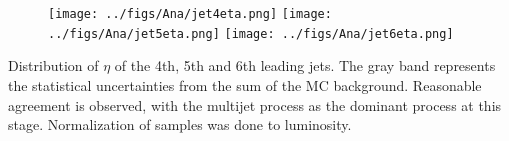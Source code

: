 \begin{frame}{}
\vspace{-.2cm}
\begin{figure}[!Hhtbp]
  \begin{center}
    \texttt{[image: ../figs/Ana/jet4eta.png]}
    \texttt{[image: ../figs/Ana/jet5eta.png]}
    \texttt{[image: ../figs/Ana/jet6eta.png]}
  \end{center}
\end{figure}

\vspace{-.2cm}
    \begin{block}{}
      \tiny \centering Distribution of $\eta$ of the 4th, 5th and 6th leading jets. The gray band represents the statistical uncertainties from the sum of the MC background. Reasonable agreement is observed, with the multijet process as the dominant process at this stage. Normalization of samples was done to luminosity.
    \end{block}

\end{frame}
